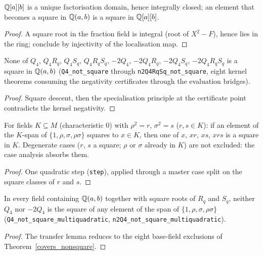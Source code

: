 \begin{lemma}\label{sq_descent}\leanok
$\mathbb{Q}[a][b]$ is a unique factorisation domain, hence integrally closed; an element that
becomes a square in $\mathbb{Q}(a,b)$ is a square in $\mathbb{Q}[a][b]$.
\end{lemma}
\begin{proof}\leanok
A square root in the fraction field is integral (root of $X^{2}-F$), hence lies in the
ring; conclude by injectivity of the localisation map.
\end{proof}

\begin{theorem}\label{covers_nonsquare}\leanok
{}
None of $Q_{4}$, $Q_{4}R_{q}$, $Q_{4}S_{q}$, $Q_{4}R_{q}S_{q}$, $-2Q_{4}$,
$-2Q_{4}R_{q}$, $-2Q_{4}S_{q}$, $-2Q_{4}R_{q}S_{q}$ is a square in $\mathbb{Q}(a,b)$
(\texttt{Q4\_not\_square} through \texttt{n2Q4RqSq\_not\_square}, eight kernel
theorems consuming the negativity certificates through the evaluation bridges).
\end{theorem}
\begin{proof}\leanok
Square descent, then the specialisation principle at the certificate point
contradicts the kernel negativity.
\end{proof}

\begin{lemma}\label{sq_transfer}\leanok
For fields $K \subseteq M$ (characteristic $0$) with $\rho^{2}=r$, $\sigma^{2}=s$
($r,s \in K$): if an element of the $K$-span of $\{1,\rho,\sigma,\rho\sigma\}$
squares to $x \in K$, then one of $x$, $xr$, $xs$, $xrs$ is a square in $K$.
Degenerate cases ($r$, $s$ a square; $\rho$ or $\sigma$ already in $K$) are not
excluded: the case analysis absorbs them.
\end{lemma}
\begin{proof}\leanok
One quadratic step (\texttt{step}), applied through a master case split on the
square classes of $r$ and $s$.
\end{proof}

\begin{theorem}\label{multiquad_verdicts}\leanok
{}
In every field containing $\mathbb{Q}(a,b)$ together with square roots of $R_{q}$ and
$S_{q}$, neither $Q_{4}$ nor $-2Q_{4}$ is the square of any element of the span
of $\{1,\rho,\sigma,\rho\sigma\}$
(\texttt{Q4\_not\_square\_multiquadratic},
\texttt{n2Q4\_not\_square\_multiquadratic}).
\end{theorem}
\begin{proof}\leanok
The transfer lemma reduces to the eight base-field exclusions of
Theorem~\ref{covers_nonsquare}.
\end{proof}

